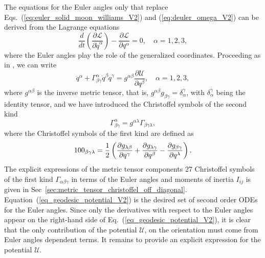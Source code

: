 \documentclass[pdflatex,sn-mathphys-num]{sn-jnl}%
\theoremstyle{thmstyleone}%
\theoremstyle{thmstyletwo}%
\theoremstyle{thmstylethree}%
\begin{document}
The equations for the Euler angles only that replace Eqs.~(\ref{eq:euler_solid_moon_williams_V2}) and (\ref{eq:deuler_omega_V2}) can be derived from the Lagrange equations
%
\begin{equation}
	\frac{d}{dt}\left(\frac{\partial \mathcal{L}}{\partial \dot{q}^\alpha}\right) - \frac{\partial \mathcal{L}}{\partial q^\alpha} = 0, \quad \alpha = 1, 2,3,
\end{equation}
%
where the Euler angles play the role of the generalized coordinates.
Proceeding as in  \citet{Broucke1990doi:10.2514/3.20591}, we can write
%
\begin{equation}\label{eq_geodesic_potential_V2}
	\ddot{q}^\alpha + 
	\Gamma^{\alpha}_{\beta\gamma} \dot{q}^\beta \dot{q}^\gamma =
	g^{\alpha\beta} \frac{\partial \mathcal{U}}{\partial q^\beta}, \quad \alpha = 1,2,3,
\end{equation}
%
where $g^{\alpha\beta}$ is the inverse metric tensor, that is, ${g^{\alpha\beta}  g_{\beta\gamma} = \delta_\alpha^\gamma}$, with $\delta_\alpha^\gamma$ being the identity tensor,
and we have introduced the Christoffel symbols of the second kind
%
\begin{equation} \label{eq:def_Christoffel_2nd_V2}
	\Gamma^\alpha_{\beta\gamma} = 
	g^{\alpha\lambda} \Gamma_{\beta\gamma\lambda}, %
\end{equation}
where the Christoffel symbols of the first kind are defined as
\begin{equation} \label{eq:def_Christoffel_1st_V2}
	100_{\beta\gamma\lambda} = 
	 \frac{1}{2} \left( \pdv{g_{\lambda\beta}}{q^\gamma} + \pdv{g_{\lambda\gamma}}{q^\beta} - \pdv{g_{\beta\gamma}}{q^\lambda} \right).
\end{equation}
%
The explicit expressions of the metric tensor components  27 Christoffel symbols of the first kind $\Gamma_{\alpha\beta\gamma}$ in terms of the Euler angles and moments of inertia ${I}_{ij}$ is given in Sec~\ref{sec:metric_tensor_christoffel_off_diagonal}.
Equation~(\ref{eq_geodesic_potential_V2}) is the desired set of second order ODEs for the Euler angles.
Since only the derivatives with respect to the Euler angles appear on the right-hand side of Eq.~(\ref{eq_geodesic_potential_V2}), it is clear that the only contribution of the potential $\mathcal{U}$, on the orientation must come from Euler angles dependent terms.
%
It remains to provide an explicit expression for the potential $\mathcal{U}$.
\end{document}
